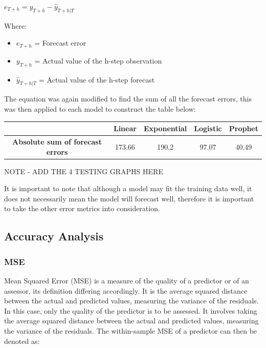 \documentclass[12pt]{mcmthesis}
\begin{document}
    ${e_{T+h} = y_{T+h} - \hat{y}_{T+h|T}}$

    Where:
    \begin{itemize}[nosep]
        \item ${e_{T+h}}$ = Forecast error
        \item ${y_{T+h}}$ = Actual value of the h-step observation
        \item ${\hat{y}_{T+h|T}}$ = Actual value of the h-step forecast
    \end{itemize}

    The equation was again modified to find the sum of all the forecast errors, this was then applied to each model to construct the table below:

    \begin{center}
        \begin{tabular}{ |c|c|c|c|c|}
            \hline
            & \textbf{Linear} & \textbf{Exponential} & \textbf{Logistic} & \textbf{Prophet} \\
            \hline
            \textbf{Absolute sum of forecast errors} & 173.66          & 190.2                & 97.07             & 40.49            \\
            \hline
        \end{tabular}
    \end{center}

    NOTE - ADD THE 4 TESTING GRAPHS HERE

    It is important to note that although a model may fit the training data well, it does not necessarily mean the model will forecast well, therefore it is important to take the other error metrics into consideration.


    \subsection{Accuracy Analysis}

    \subsubsection*{MSE}
    Mean Squared Error (MSE) is a measure of the quality of a predictor or of an assessor, its definition differing accordingly. It is the average squared distance between the actual and predicted values, measuring the variance of the residuals. In this case, only the quality of the predictor is to be assessed. It involves taking the average squared distance between the actual and predicted values, measuring the variance of the residuals. The within-sample MSE of a predictor can then be denoted as:
\end{document}
